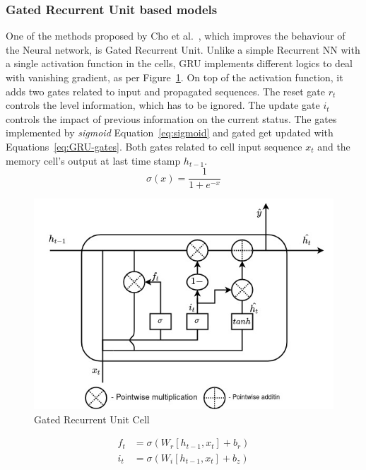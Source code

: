 \subsubsection{Gated Recurrent Unit based models} \label{subsub:gru}
One of the methods proposed by Cho et al.~\cite{GRU_cho_properties_2014}, which improves the behaviour of the Neural network, is Gated Recurrent Unit.
Unlike a simple Recurrent NN with a single activation function in the cells, GRU implements different logics to deal with vanishing gradient, as per Figure~\ref{fig:GRU-cell}.
On top of the activation function, it adds two gates related to input and propagated sequences.
The reset gate $r_t$ controls the level information, which has to be ignored.
The update gate $i_t$ controls the impact of previous information on the current status.
The gates implemented by \textit{sigmoid} Equation~\ref{eq:sigmoid} and gated get updated with Equations~\ref{eq:GRU-gates}.
Both gates related to cell input sequence $x_t$ and the memory cell's output at last time stamp $h_{t-1}$.
\begin{equation}
    \sigma(x) = \frac{1}{1+e^{-x}}
    \label{eq:sigmoid}
\end{equation}
\begin{figure}[ht]%
    \centering
    \includegraphics[width=0.7\linewidth]{II_Body/GRU/images/GRU.jpg}
    \caption{Gated Recurrent Unit Cell}
    \label{fig:GRU-cell}
\end{figure}
\begin{equation}
    \begin{split}
        f_t &= \sigma \left (W_{r} \left [h_{t-1}, x_t \right ] + b_r \right ) \\
        i_t &= \sigma \left (W_{i} \left [h_{t-1}, x_t \right ] + b_z \right )
    \end{split}
    \label{eq:GRU-gates}
\end{equation}
